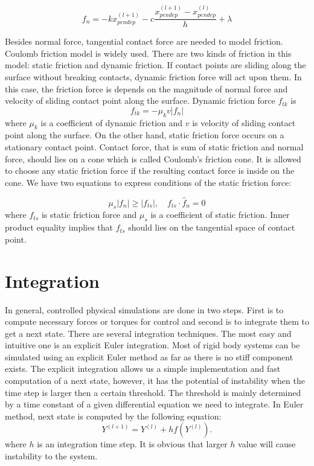 \documentclass[master,english,final]{kaist-ucs}
\begin{document}
\begin{equation}\label{penalty-normal-discretized}
f_n = -k x_{pendep}^{(l+1)} - c \frac{x_{pendep}^{(l+1)} - x_{pendep}^{(l)}}{h} + \lambda
\end{equation}

Besides normal force, tangential contact force are needed to model friction.
Coulomb friction model is widely used.
There are two kinds of friction in this model: static friction and dynamic friction.
If contact points are sliding along the surface without breaking contacts,
dynamic friction force will act upon them. In this case, the friction force is depends
on the magnitude of normal force and velocity of sliding contact point along the surface.
Dynamic friction force $f_{tk}$ is
\begin{equation}\label{dynamic-friction}
f_{tk} = -\mu_k v |f_n|
\end{equation}
where $\mu_k$ is a coefficient of dynamic friction
and $v$ is velocity of sliding contact point along the surface.
On the other hand, static friction force occurs on a stationary contact point.
Contact force, that is sum of static friction and normal force, should lies on a cone
which is called Coulomb's friction cone.
It is allowed to choose any static friction force if the resulting contact force is
inside on the cone. We have two equations to express conditions of the static friction force:

\begin{equation}\label{static-friction}
\mu_s |f_n| \geq |f_{ts}|, \quad f_{ts} \cdot \hat{f}_n = 0
\end{equation}
where $f_{ts}$ is static friction force and $\mu_s$ is a coefficient of static friction.
Inner product equality implies that $f_{ts}$ should lies on the tangential space of contact point.


\chapter{Integration}

In general, controlled physical simulations are done in two steps.
First is to compute necessary forces or torques for control and
second is to integrate them to get a next state.
There are several integration techniques.
The most easy and intuitive one is an explicit Euler integration.
Most of rigid body systems can be simulated using an explicit Euler method
as far as there is no stiff component exists. The explicit integration
allows us a simple implementation and fast computation of a next state,
however, it has the potential of instability when the time step is larger
then a certain threshold. The threshold is mainly determined by a time
constant of a given differential equation we need to integrate.
In Euler method, next state is computed by the following equation:
\begin{equation}
Y^{(l+1)}=Y^{(l)} + hf(Y^{(l)}).
\end{equation}
where $h$ is an integration time step.
It is obvious that larger $h$ value will cause instability to the system.
\end{document}
